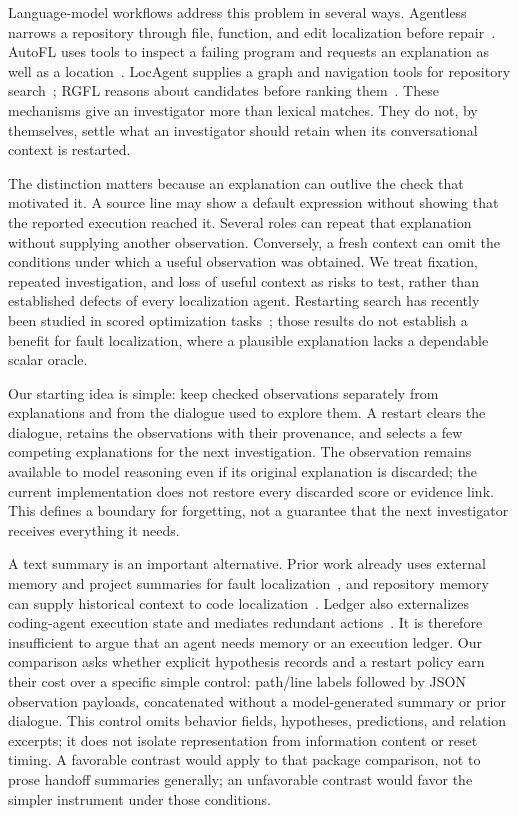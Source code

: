 \documentclass[letterpaper,journal]{IEEEtran}
\begin{document}
Language-model workflows address this problem in several ways. Agentless narrows a repository through file, function, and edit localization before repair~\cite{agentless2025}. AutoFL uses tools to inspect a failing program and requests an explanation as well as a location~\cite{autofl2024}. LocAgent supplies a graph and navigation tools for repository search~\cite{locagent2025}; RGFL reasons about candidates before ranking them~\cite{rgfl2026}. These mechanisms give an investigator more than lexical matches. They do not, by themselves, settle what an investigator should retain when its conversational context is restarted.

The distinction matters because an explanation can outlive the check that motivated it. A source line may show a default expression without showing that the reported execution reached it. Several roles can repeat that explanation without supplying another observation. Conversely, a fresh context can omit the conditions under which a useful observation was obtained. We treat fixation, repeated investigation, and loss of useful context as risks to test, rather than established defects of every localization agent. Restarting search has recently been studied in scored optimization tasks~\cite{forgetting2026}; those results do not establish a benefit for fault localization, where a plausible explanation lacks a dependable scalar oracle.

Our starting idea is simple: keep checked observations separately from explanations and from the dialogue used to explore them. A restart clears the dialogue, retains the observations with their provenance, and selects a few competing explanations for the next investigation. The observation remains available to model reasoning even if its original explanation is discarded; the current implementation does not restore every discarded score or evidence link. This defines a boundary for forgetting, not a guarantee that the next investigator receives everything it needs.

A text summary is an important alternative. Prior work already uses external memory and project summaries for fault localization~\cite{memfl2025}, and repository memory can supply historical context to code localization~\cite{repomem2026}. Ledger also externalizes coding-agent execution state and mediates redundant actions~\cite{ledger2026}. It is therefore insufficient to argue that an agent needs memory or an execution ledger. Our comparison asks whether explicit hypothesis records and a restart policy earn their cost over a specific simple control: path/line labels followed by JSON observation payloads, concatenated without a model-generated summary or prior dialogue. This control omits behavior fields, hypotheses, predictions, and relation excerpts; it does not isolate representation from information content or reset timing. A favorable contrast would apply to that package comparison, not to prose handoff summaries generally; an unfavorable contrast would favor the simpler instrument under those conditions.
\end{document}
